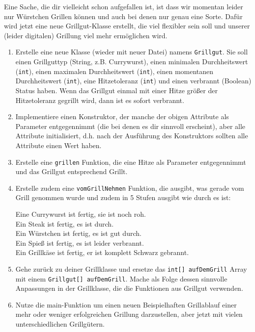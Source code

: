 \documentclass{../../sheet}
\begin{document}
\newpage
{}
Eine Sache, die dir vielleicht schon aufgefallen ist, ist dass wir momentan leider nur Würstchen Grillen können und auch bei denen nur genau eine Sorte. Dafür wird jetzt eine neue Grillgut-Klasse erstellt, die viel flexibler sein soll und unserer (leider digitalen) Grillung viel mehr ermöglichen wird.
\begin{enumerate}
    \item Erstelle eine neue Klasse (wieder mit neuer Datei) namens \texttt{Grillgut}. Sie soll einen Grillguttyp (String, z.B. Currywurst), einen minimalen Durchheitswert (\texttt{int}), einen maximalen Durchheitswert (\texttt{int}), einen momentanen Durchheitswert (\texttt{int}), eine Hitzetoleranz (\texttt{int}) und einen verbrannt (Boolean) Status haben. Wenn das Grillgut einmal mit einer Hitze größer der Hitzetoleranz gegrillt wird, dann ist es sofort verbrannt.
    \item Implementiere einen Konstruktor, der manche der obigen Attribute als Parameter entgegennimmt (die bei denen es dir sinnvoll erscheint), aber alle Attribute initialisiert, d.h. nach der Ausführung des Konstruktors sollten alle Attribute einen Wert haben.
    \item Erstelle eine \texttt{grillen} Funktion, die eine Hitze als Parameter entgegennimmt und das Grillgut entsprechend Grillt. 
    \item Erstelle zudem eine \texttt{vomGrillNehmen} Funktion, die ausgibt, was gerade vom Grill genommen wurde und zudem in 5 Stufen ausgibt wie durch es ist:
    \begin{ausgabe}
Eine Currywurst ist fertig, sie ist noch roh.\\
Ein Steak ist fertig, es ist durch.\\
Ein Würstchen ist fertig, es ist gut durch.\\
Ein Spieß ist fertig, es ist leider verbrannt.\\
Ein Grillkäse ist fertig, er ist komplett Schwarz gebrannt.
    \end{ausgabe}
    \item Gehe zurück zu deiner Grillklasse und ersetze das \texttt{int[] aufDemGrill} Array mit einem \texttt{Grillgut[] aufDemGrill}. Mache als Folge dessen sinnvolle Anpassungen in der Grillklasse, die die Funktionen aus Grillgut verwenden.
    \item Nutze die main-Funktion um einen neuen Beispielhaften Grillablauf einer mehr oder weniger erfolgreichen
    Grillung darzustellen, aber jetzt mit vielen unterschiedlichen Grillgütern.
\end{enumerate}
\end{document}

